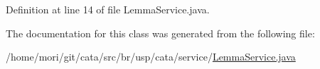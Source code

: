 Definition at line 14 of file Lemma\+Service.\+java.



The documentation for this class was generated from the following file\+:\begin{DoxyCompactItemize}
\item 
/home/mori/git/cata/src/br/usp/cata/service/\hyperlink{_lemma_service_8java}{Lemma\+Service.\+java}\end{DoxyCompactItemize}
